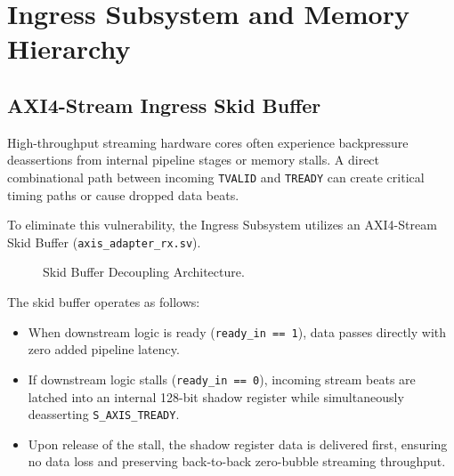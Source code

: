 \chapter{Ingress Subsystem and Memory Hierarchy}
\label{chap:ingress_memory}

\section{AXI4-Stream Ingress Skid Buffer}
High-throughput streaming hardware cores often experience backpressure deassertions from internal pipeline stages or memory stalls. A direct combinational path between incoming \texttt{TVALID} and \texttt{TREADY} can create critical timing paths or cause dropped data beats. 

To eliminate this vulnerability, the Ingress Subsystem utilizes an AXI4-Stream Skid Buffer (\texttt{axis\_adapter\_rx.sv}). 
\begin{figure}[htbp]
    \centering
    \caption{Skid Buffer Decoupling Architecture.}
    \label{fig:skid_buffer}
\end{figure}

The skid buffer operates as follows:
\begin{itemize}
    \item When downstream logic is ready (\texttt{ready\_in == 1}), data passes directly with zero added pipeline latency.
    \item If downstream logic stalls (\texttt{ready\_in == 0}), incoming stream beats are latched into an internal 128-bit shadow register while simultaneously deasserting \texttt{S\_AXIS\_TREADY}.
    \item Upon release of the stall, the shadow register data is delivered first, ensuring no data loss and preserving back-to-back zero-bubble streaming throughput.
\end{itemize}


